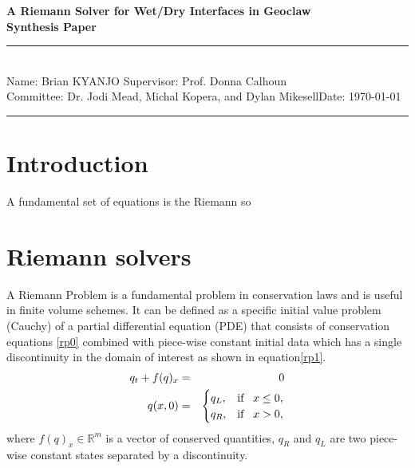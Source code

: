 \documentclass[12pt,a4paper]{article}
\newcommand{\donna}[1]{{\color{red}{#1}}}
\newcommand{\student}{Brian KYANJO }
\newcommand{\course}{Dr. Jodi Mead, Michal Kopera, and Dylan Mikesell}
\newcommand{\assignment}{ Prof. Donna Calhoun}
\begin{document}
	
	\thispagestyle{empty}
	\begin{center}
		\textbf{A Riemann Solver for Wet/Dry Interfaces in Geoclaw \\[0.5cm]
			Synthesis Paper}
		\vspace{.2cm}
	\end{center}
	
	 
	\rule{17cm}{0.2cm}\\[0.3cm]
	Name: \student \hfill Supervisor: \assignment\\[0.1cm]
	Committee: \course \hfill Date: \today\\
	\rule{17cm}{0.05cm}
	\vspace{.2cm}
	
	\section{Introduction}

	\donna{Motivate five papers:   Dry and Wet states, possible methods, implementations. Applications to tsunamis, flooding, other natural hazards. How do we solve the Riemann problem for wet and dry states?}

	A fundamental set of equations is the Riemann so

	\section{Riemann solvers}
	A Riemann Problem is a fundamental problem in conservation laws and is useful in finite volume schemes. It can be defined as a specific initial value problem  (Cauchy) of a partial differential equation (PDE) that consists of conservation equations \eqref{rp0}  combined with piece-wise constant initial data which has a single discontinuity in the domain of interest as shown in equation\eqref{rp1}. 
	\begin{eqnarray}
		q_{t} + f(q)_{x}& =& 0
		\label{rp0}\\
		q(x,0)& =& \begin{cases}
			q_{L}, & \text{if \, $x \le 0,$}\\
			q_{R},& \text{if \, $x > 0,$}\\
			
		\end{cases}  
		\label{rp1}     
	\end{eqnarray}
	where $f(q)_{x} \in \mathbb{R}^{m}$ is a vector of conserved quantities,  $q_{R}$ and $q_{L}$ are two piece-wise constant states separated by a discontinuity. 
	
\end{document}
